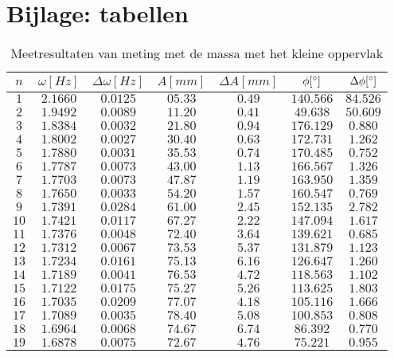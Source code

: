 \documentclass[12pt,a4]{article}
\begin{document}
\section{Bijlage: tabellen}
\begin{table}[h]
\centering
\caption{Meetresultaten van meting met de massa met het kleine oppervlak}
\begin{tabular}{c | c | c | c | c | c | c }
$ n $&$\omega [Hz] $&$ \Delta\omega [Hz] $&$ A [mm] $&$ \Delta A [mm] $&$ \phi [\degree] $&$ \Delta \phi [\degree] $\\
\hline
$ 1 $&$ 2.1660 $&$ 0.0125 $&$ 05.33 $&$ 0.49 $&$ 140.566 $&$ 84.526 $\\
$ 2 $&$ 1.9492 $&$ 0.0089 $&$ 11.20 $&$ 0.41 $&$ 49.638 $&$ 50.609 $\\
$ 3 $&$ 1.8384 $&$ 0.0032 $&$ 21.80 $&$ 0.94 $&$ 176.129 $&$ 0.880 $\\
$ 4 $&$ 1.8002 $&$ 0.0027 $&$ 30.40 $&$ 0.63 $&$ 172.731 $&$ 1.262 $\\
$ 5 $&$ 1.7880 $&$ 0.0031 $&$ 35.53 $&$ 0.74 $&$ 170.485 $&$ 0.752 $\\
$ 6 $&$ 1.7787 $&$ 0.0073 $&$ 43.00 $&$ 1.13 $&$ 166.567 $&$ 1.326 $\\
$ 7 $&$ 1.7703 $&$ 0.0073 $&$ 47.87 $&$ 1.19 $&$ 163.950 $&$ 1.359 $\\
$ 8 $&$ 1.7650 $&$ 0.0033 $&$ 54.20 $&$ 1.57 $&$ 160.547 $&$ 0.769 $\\
$ 9 $&$ 1.7391 $&$ 0.0284 $&$ 61.00 $&$ 2.45 $&$ 152.135 $&$ 2.782 $\\
$ 10 $&$ 1.7421 $&$ 0.0117 $&$ 67.27 $&$ 2.22 $&$ 147.094 $&$ 1.617 $\\
$ 11 $&$ 1.7376 $&$ 0.0048 $&$ 72.40 $&$ 3.64 $&$ 139.621 $&$ 0.685 $\\
$ 12 $&$ 1.7312 $&$ 0.0067 $&$ 73.53 $&$ 5.37 $&$ 131.879 $&$ 1.123 $\\
$ 13 $&$ 1.7234 $&$ 0.0161 $&$ 75.13 $&$ 6.16 $&$ 126.647 $&$ 1.260 $\\
$ 14 $&$ 1.7189 $&$ 0.0041 $&$ 76.53 $&$ 4.72 $&$ 118.563 $&$ 1.102 $\\
$ 15 $&$ 1.7122 $&$ 0.0175 $&$ 75.27 $&$ 5.26 $&$ 113.625 $&$ 1.803 $\\
$ 16 $&$ 1.7035 $&$ 0.0209 $&$ 77.07 $&$ 4.18 $&$ 105.116 $&$ 1.666 $\\
$ 17 $&$ 1.7089 $&$ 0.0035 $&$ 78.40 $&$ 5.08 $&$ 100.853 $&$ 0.808 $\\
$ 18 $&$ 1.6964 $&$ 0.0068 $&$ 74.67 $&$ 6.74 $&$ 86.392 $&$ 0.770 $\\
$ 19 $&$ 1.6878 $&$ 0.0075 $&$ 72.67 $&$ 4.76 $&$ 75.221 $&$ 0.955 $\\

\end{tabular}
\end{table}
\end{document}
